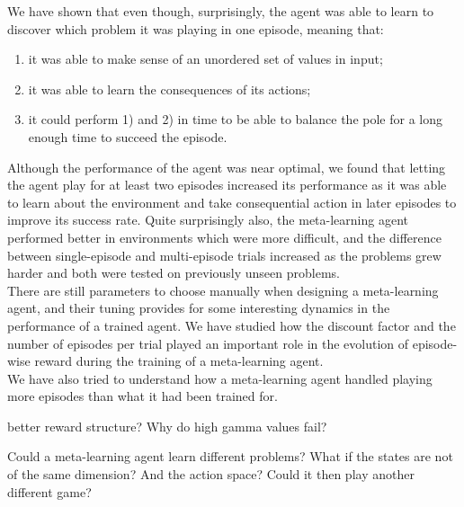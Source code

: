 We have shown that even though, surprisingly, the agent was able to learn
to discover which problem it was playing in one episode, meaning that:
\begin{enumerate}
	\item it was able to make sense of an unordered set of values in input;
	\item it was able to learn the consequences of its actions;
	\item it could perform 1) and 2) in time to be able to balance the
		pole for a long enough time to succeed the episode.
\end{enumerate}
Although the performance of the agent was near optimal, we found that letting
the agent play for at least two episodes increased its performance as it
was able to learn about the environment and take consequential action in
later episodes to improve its success rate. Quite surprisingly also,
the meta-learning agent performed better in environments which were more
difficult, and the difference between single-episode and multi-episode trials
increased as the problems grew harder and both were tested on previously unseen
problems.\\

There are still parameters to choose manually when designing a meta-learning
agent, and their tuning provides for some interesting dynamics in the 
performance of a trained agent. We have studied how the discount factor
and the number of episodes per trial
played an important role in the evolution of episode-wise reward during the 
training of a meta-learning agent.\\

We have also tried to understand how a meta-learning agent handled playing
more episodes than what it had been trained for.

better reward structure?
Why do high gamma values fail?

Could a meta-learning agent learn different problems? 
What if the states are not of the same dimension? And the action space?
Could it then play another different game?

